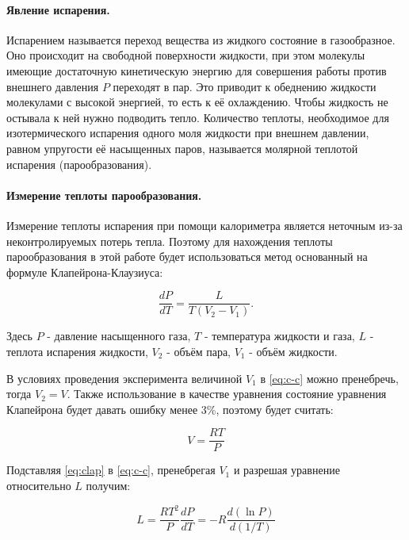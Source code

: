\documentclass[a4paper,12pt]{article} %
\begin{document}
\paragraph{Явление испарения.}
Испарением называется переход вещества из жидкого состояние в газообразное. Оно происходит на свободной поверхности жидкости, при этом молекулы имеющие достаточную кинетическую энергию для совершения работы против внешнего давления $P$ переходят в пар. Это приводит к обеднению жидкости молекулами с высокой энергией, то есть к её охлаждению. Чтобы жидкость не остывала к ней нужно подводить тепло. Количество теплоты, необходимое для изотермического испарения одного моля жидкости при внешнем давлении, равном упругости её насыщенных паров, называется молярной теплотой испарения (парообразования).

\paragraph{Измерение теплоты парообразования.}
Измерение теплоты испарения при помощи калориметра является неточным из-за неконтролируемых потерь тепла. Поэтому для нахождения теплоты парообразования в этой работе будет использоваться метод основанный на формуле Клапейрона-Клаузиуса:

\begin{equation}
\frac{dP}{dT} = \frac{L}{T \left( V_2 - V_1 \right)}. \label{eq:c-c}
\end{equation}

\noindent Здесь $P$ - давление насыщенного газа, $T$ - температура жидкости и газа, $L$ - теплота испарения жидкости, $V_2$ - объём пара, $V_1$ - объём жидкости.

В условиях проведения эксперимента величиной $V_1$ в \eqref{eq:c-c} можно пренебречь, тогда $V_2 = V$. Также использование в качестве уравнения состояние уравнения Клапейрона будет давать ошибку менее 3\%, поэтому будет считать:

\begin{equation}
V = \frac{RT}{P} \label{eq:clap}
\end{equation}

Подставляя \eqref{eq:clap} в \eqref{eq:c-c}, пренебрегая $V_1$ и разрешая уравнение относительно $L$ получим:

\begin{equation}
L = \frac{RT^2}{P} \frac{dP}{dT} = - R \frac{d \left( \ln{P} \right)}{d \left( 1/T \right)} \label{eq:capacity}
\end{equation}
\end{document}
